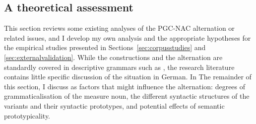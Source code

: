 \documentclass[USenglish]{article}
\begin{document}

\subsection{A theoretical assessment}
\label{sec:analyses}

This section reviews some existing analyses of the PGC-NAC alternation or related issues, and I develop my own analysis and the appropriate hypotheses for the empirical studies presented in Sections~\ref{sec:corpusstudies} and \ref{sec:externalvalidation}.
While the constructions and the alternation are standardly covered in descriptive grammars such as \citet[XYZ]{Eisenberg2013a}, the research literature contains little specific discussion of the situation in German.
In The remainder of this section, I discuss as factors that might influence the alternation:
degrees of grammaticalisation of the measure noun, the different syntactic structures of the variants and their syntactic prototypes, and potential effects of semantic prototypicality.
\end{document}
